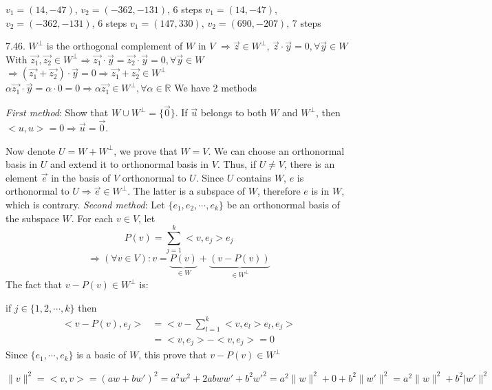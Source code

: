 		 $v_1 = (14, -47)$, $v_2 = (-362, -131)$, 6 steps
		 $v_1 = (14, -47)$, $v_2 = (-362, -131)$, 6 steps
		 $v_1 = (147, 330)$, $v_2 = (690, -207)$, 7 steps
	


7.46.	
		 $W^\perp$ is the orthogonal complement of $W$ in $V$ $\Rightarrow \vec{z} \in W^\perp$, $\vec{z}\cdot\vec{y} = 0, \forall \vec{y} \in W$ \\ With $\vec{z_1}, \vec{z_2} \in W^\perp \Rightarrow \vec{z_1}\cdot\vec{y} = \vec{z_2}\cdot\vec{y} = 0, \forall \vec{y} \in W$ \\ $\Rightarrow (\vec{z_1} + \vec{z_2})\cdot\vec{y} = 0 \Rightarrow \vec{z_1} + \vec{z_2} \in W^\perp$ \\ $\alpha\vec{z_1}\cdot\vec{y} = \alpha \cdot 0 = 0 \Rightarrow \alpha\vec{z_1} \in W^\perp, \forall \alpha \in \mathbb{R}$
		 We have 2 methods
		
			 \textit{First method}: Show that $W \cup W^\perp = \{\vec{0}\}$. If $\vec{u}$ belongs to both $W$ and $W^\perp$, then $<u, u> = 0 \Rightarrow \vec{u} = \vec{0}$.
			
			Now denote $U = W + W^\perp$, we prove that $W = V$. We can choose an orthonormal basis in $U$ and extend it to orthonormal basis in $V$. Thus, if $U \neq V$, there is an element $\vec{e}$ in the basis of $V$ orthonormal to $U$. Since $U$ contains $W$, $e$ is orthonormal to $U \Rightarrow \vec{e} \in W^\perp$. The latter is a subspace of $W$, therefore $e$ is in $W$, which is contrary.
			 \textit{Second method}: Let $\{e_1, e_2, \cdots, e_k\}$ be an orthonormal basis of the subspace $W$. For each $v \in V$, let $$P(v) = \sum_{j=1}^{k} <v, e_j> e_j$$ $$\Rightarrow (\forall v \in V): v = \underbrace{P(v)}_{\in W} + \underbrace{(v - P(v))}_{\in W^\perp}$$
			The fact that $v - P(v) \in W^\perp$ is: 
			
			if $j \in \{1, 2, \cdots, k\}$ then 
			\begin{align*}
				<v-P(v), e_j> & = <v - \sum_{l=1}^{k}<v, e_l>e_l, e_j> \\
					& = <v, e_j> - <v, e_j> = 0	
			\end{align*}
			Since $\{e_1, \cdots, e_k\}$ is a basic of $W$, this prove that $v-P(v) \in W^\perp$
		
		 $\lVert v \rVert^2 = <v, v> = (aw + bw')^2 = a^2w^2 + 2abww' + b^2w'^2 = a^2 \lVert w \rVert^2 + 0 + b^2 \lVert w' \rVert^2 = a^2 \lVert w \rVert^2 + b^2 \lvert w' \rVert^2$
	
